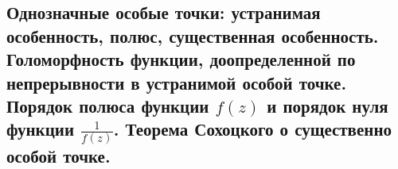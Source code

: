 \subsection{Однозначные особые точки: устранимая особенность, полюс, существенная особенность. Голоморфность функции, доопределенной по непрерывности в устранимой особой точке. Порядок полюса функции $f(z)$ и порядок нуля функции $\frac{1}{f(z)}$. Теорема Сохоцкого о существенно особой точке.}
